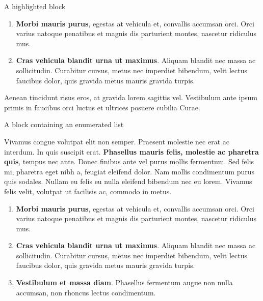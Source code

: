\documentclass[final]{beamer}
\newlength{\colwidth}
\begin{document}
\begin{frame}[t]
\begin{columns}[t]
\begin{column}{\colwidth}
\begin{alertblock}{A highlighted block}
        \begin{enumerate}
          \item \textbf{Morbi mauris purus}, egestas at vehicula et, convallis
          accumsan orci. Orci varius natoque penatibus et magnis dis parturient
          montes, nascetur ridiculus mus.
          \item \textbf{Cras vehicula blandit urna ut maximus}. Aliquam blandit nec
          massa ac sollicitudin. Curabitur cursus, metus nec imperdiet bibendum,
          velit lectus faucibus dolor, quis gravida metus mauris gravida turpis.
        \end{enumerate}

        Aenean tincidunt risus eros, at gravida lorem sagittis vel. Vestibulum ante
        ipsum primis in faucibus orci luctus et ultrices posuere cubilia Curae.

      \end{alertblock}

      \begin{defbox}{A block containing an enumerated list}{}

        Vivamus congue volutpat elit non semper. Praesent molestie nec erat ac
        interdum. In quis suscipit erat. \textbf{Phasellus mauris felis, molestie
          ac pharetra quis}, tempus nec ante. Donec finibus ante vel purus mollis
        fermentum. Sed felis mi, pharetra eget nibh a, feugiat eleifend dolor. Nam
        mollis condimentum purus quis sodales. Nullam eu felis eu nulla eleifend
        bibendum nec eu lorem. Vivamus felis velit, volutpat ut facilisis ac,
        commodo in metus.

        \begin{enumerate}
          \item \textbf{Morbi mauris purus}, egestas at vehicula et, convallis
          accumsan orci. Orci varius natoque penatibus et magnis dis parturient
          montes, nascetur ridiculus mus.
          \item \textbf{Cras vehicula blandit urna ut maximus}. Aliquam blandit nec
          massa ac sollicitudin. Curabitur cursus, metus nec imperdiet bibendum,
          velit lectus faucibus dolor, quis gravida metus mauris gravida turpis.
          \item \textbf{Vestibulum et massa diam}. Phasellus fermentum augue non
          nulla accumsan, non rhoncus lectus condimentum.
        \end{enumerate}

      \end{defbox}


\end{column}
\end{columns}
\end{frame}
\end{document}
